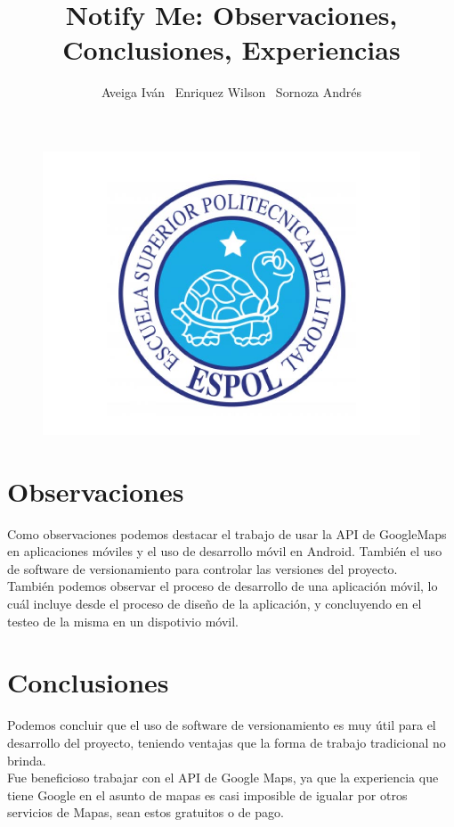\documentclass[a4paper,11pt]{article}
\begin{document}
\author{
	Aveiga Iván \ Enriquez Wilson \ Sornoza Andrés
}
\title{Notify Me: Observaciones, Conclusiones, Experiencias }
\maketitle
\begin{figure}[h]
\centering
\includegraphics[width=0.7\linewidth]{./logo}
\end{figure}

\newpage
\section{Observaciones}
Como observaciones podemos destacar el trabajo de usar la API de GoogleMaps en aplicaciones móviles y el uso de desarrollo móvil en Android. También el uso de software de versionamiento para controlar las versiones del proyecto. \\

También podemos observar el proceso de desarrollo de una aplicación móvil, lo cuál incluye desde el proceso de diseño de la aplicación, y concluyendo en el testeo de la misma en un dispotivio móvil.

\section{Conclusiones}
Podemos concluir que el uso de software de versionamiento es muy útil para el desarrollo del proyecto, teniendo ventajas que la forma de trabajo tradicional no brinda. \\

Fue beneficioso trabajar con el API de Google Maps, ya que la experiencia que tiene Google en el asunto de mapas es casi imposible de igualar por otros servicios de Mapas, sean estos gratuitos o de pago. \\
\end{document}
